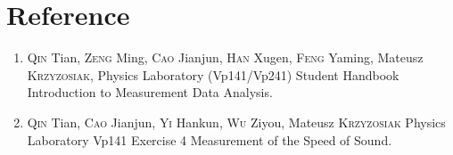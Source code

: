 \section{Reference}

\begin{enumerate}

\item \textsc{Qin} Tian, \textsc{Zeng} Ming, \textsc{Cao} Jianjun, \textsc{Han} Xugen, \textsc{Feng} Yaming, Mateusz \textsc{Krzyzosiak}, Physics Laboratory (Vp141/Vp241) Student Handbook Introduction to Measurement Data Analysis.
\item \textsc{Qin} Tian, \textsc{Cao} Jianjun, \textsc{Yi} Hankun, \textsc{Wu} Ziyou, Mateusz \textsc{Krzyzosiak} Physics Laboratory Vp141 Exercise 4 Measurement of the Speed of Sound.
\end{enumerate}